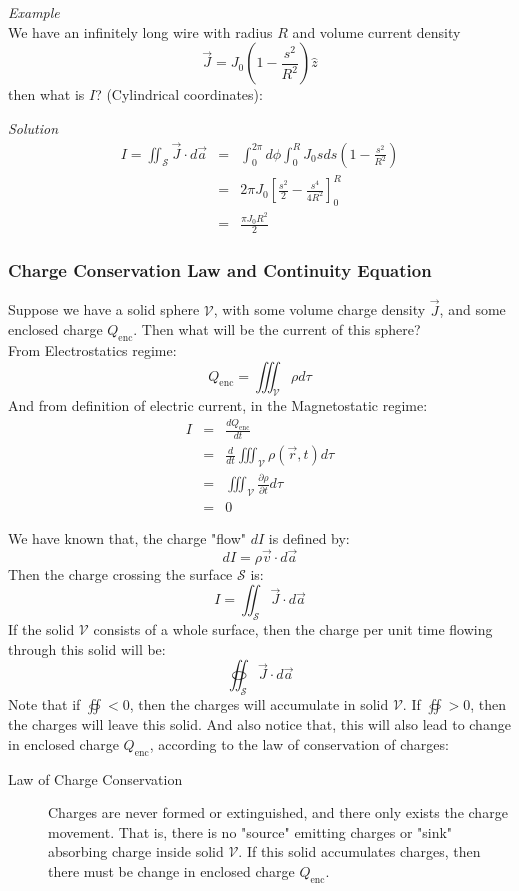 \documentclass[12pt,a4paper,twoside]{article}
\begin{document}
    \noindent\textit{Example}\\
    \noindent We have an infinitely long wire with radius $R$ and volume current density
    \[\overrightarrow{J}=J_0\left(1-\frac{s^2}{R^2}\right)\hat{z}\]
    then what is $I$? (Cylindrical coordinates):
    
    \noindent \textit{Solution}
    \begin{eqnarray*}
        I = \iint_{\mathcal{S}}\overrightarrow{J}\cdot d\overrightarrow{a} &=& \int_{0}^{2\pi}d\phi\int_{0}^{R}J_0 sds\left(1-\frac{s^2}{R^2}\right)\\
        &=& 2\pi J_0\left[\frac{s^2}{2}-\frac{s^4}{4R^2}\right]^{R}_{0}\\
        &=& \frac{\pi J_0 R^2}{2}
    \end{eqnarray*}
    
\subsubsection{Charge Conservation Law and Continuity Equation}
Suppose we have a solid sphere $\mathcal{V}$, with some volume charge density $\overrightarrow{J}$, and some enclosed charge $Q_{\mathrm{enc}}$. Then what will be the current of this sphere?\\

\noindent From Electrostatics regime:
\[Q_{\mathrm{enc}}=\iiint_{\mathcal{V}} \rho d\tau\]
And from definition of electric current, in the Magnetostatic regime:
\begin{eqnarray*}
I &=& \frac{dQ_{\mathrm{enc}}}{dt}\\
&=&\frac{d}{dt}\iiint_\mathcal{V} \rho(\overrightarrow{r}, t) d\tau\\
&=&\iiint_\mathcal{V}\frac{\partial \rho}{\partial t}d\tau\\
&=& 0
\end{eqnarray*}

\noindent We have known that, the charge "flow" $dI$ is defined by:
\[dI=\rho\overrightarrow{v}\cdot d\overrightarrow{a}\]
Then the charge crossing the surface $\mathcal{S}$ is:
\[I=\iint_\mathcal{S}\overrightarrow{J}\cdot d\overrightarrow{a}\]
If the solid $\mathcal{V}$ consists of a whole surface, then the charge per unit time flowing through this solid will be:
\[\oiint_{\mathcal{S}}\overrightarrow{J}\cdot d\overrightarrow{a}\]
Note that if $\oiint<0$, then the charges will accumulate in solid $\mathcal{V}$. If $\oiint>0$, then the charges will leave this solid. And also notice that, this will also lead to change in enclosed charge $Q_{\mathrm{enc}}$, according to the law of conservation of charges:\
\begin{description}
    \item[Law of Charge Conservation] Charges are never formed or extinguished, and there only exists the charge movement. That is, there is no "source" emitting charges or "sink" absorbing charge inside solid $\mathcal{V}$. If this solid accumulates charges, then there must be change in enclosed charge $Q_{\mathrm{enc}}$.
\end{description}
\end{document}
